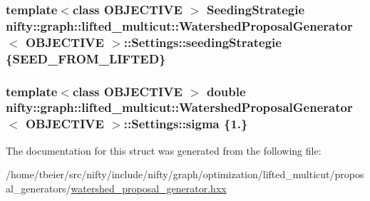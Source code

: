 \subsubsection[{seeding\+Strategie}]{\setlength{\rightskip}{0pt plus 5cm}template$<$class O\+B\+J\+E\+C\+T\+I\+V\+E $>$ {\bf Seeding\+Strategie} {\bf nifty\+::graph\+::lifted\+\_\+multicut\+::\+Watershed\+Proposal\+Generator}$<$ O\+B\+J\+E\+C\+T\+I\+V\+E $>$\+::Settings\+::seeding\+Strategie \{{\bf S\+E\+E\+D\+\_\+\+F\+R\+O\+M\+\_\+\+L\+I\+F\+T\+E\+D}\}}\label{structnifty_1_1graph_1_1lifted__multicut_1_1WatershedProposalGenerator_1_1Settings_a1eaea0285e019dafcd674ba1d7ef384a}
\hypertarget{structnifty_1_1graph_1_1lifted__multicut_1_1WatershedProposalGenerator_1_1Settings_a6657b29d3bf60d3ad2b0f0db65ae9ae8}{}
\subsubsection[{sigma}]{\setlength{\rightskip}{0pt plus 5cm}template$<$class O\+B\+J\+E\+C\+T\+I\+V\+E $>$ double {\bf nifty\+::graph\+::lifted\+\_\+multicut\+::\+Watershed\+Proposal\+Generator}$<$ O\+B\+J\+E\+C\+T\+I\+V\+E $>$\+::Settings\+::sigma \{1.\}}\label{structnifty_1_1graph_1_1lifted__multicut_1_1WatershedProposalGenerator_1_1Settings_a6657b29d3bf60d3ad2b0f0db65ae9ae8}


The documentation for this struct was generated from the following file\+:\begin{DoxyCompactItemize}
\item 
/home/tbeier/src/nifty/include/nifty/graph/optimization/lifted\+\_\+multicut/proposal\+\_\+generators/\hyperlink{lifted__multicut_2proposal__generators_2watershed__proposal__generator_8hxx}{watershed\+\_\+proposal\+\_\+generator.\+hxx}\end{DoxyCompactItemize}
